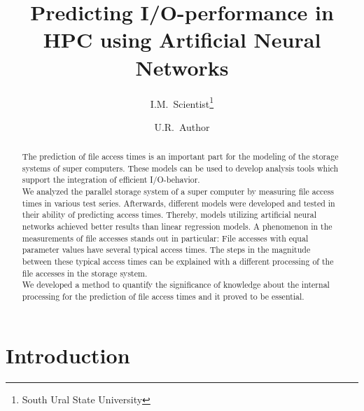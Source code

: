\documentclass{superfri}
\begin{document}
\author{I.M.~Scientist\footnote{\label{susu}South Ural State University} \and U.R.~Author}

\title{Predicting I/O-performance in HPC using Artificial Neural Networks}

\maketitle{}

\begin{abstract} %
	
The prediction of file access times is an important part for the modeling of the storage systems of super computers. These models can be used to develop analysis tools which support the integration of efficient I/O-behavior.\\
We analyzed the parallel storage system of a super computer by measuring file access times in various test series. Afterwards, different models were developed and tested in their ability of predicting access times. Thereby, models utilizing artificial neural networks achieved better results than linear regression models.
A phenomenon in the measurements of file accesses stands out in particular:
File accesses with equal parameter values have several typical access times.
The steps in the magnitude between these typical access times can be explained with a different processing of the file accesses in the storage system.\\
We developed a method to quantify the significance of knowledge about the internal processing for the prediction of file access times and it proved to be essential.

\end{abstract}

\section*{Introduction} %
\label{sec:intro}
\end{document}
